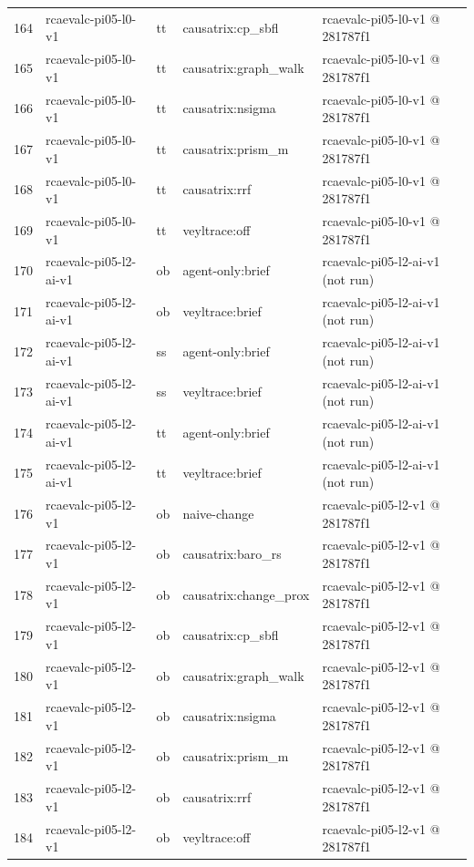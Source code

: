 \begin{longtable}{@{}r>{\raggedright\arraybackslash}p{87.0pt}>{\raggedright\arraybackslash}p{18.0pt}>{\raggedright\arraybackslash}p{63.0pt}>{\raggedright\arraybackslash}p{108.0pt}@{}}
164 & rcaevalc-pi05-l0-v1 & tt & causatrix:cp\_sbfl & rcaevalc-pi05-l0-v1 @ 281787f1 \\
165 & rcaevalc-pi05-l0-v1 & tt & causatrix:graph\_walk & rcaevalc-pi05-l0-v1 @ 281787f1 \\
166 & rcaevalc-pi05-l0-v1 & tt & causatrix:nsigma & rcaevalc-pi05-l0-v1 @ 281787f1 \\
167 & rcaevalc-pi05-l0-v1 & tt & causatrix:prism\_m & rcaevalc-pi05-l0-v1 @ 281787f1 \\
168 & rcaevalc-pi05-l0-v1 & tt & causatrix:rrf & rcaevalc-pi05-l0-v1 @ 281787f1 \\
169 & rcaevalc-pi05-l0-v1 & tt & veyltrace:off & rcaevalc-pi05-l0-v1 @ 281787f1 \\
170 & rcaevalc-pi05-l2-ai-v1 & ob & agent-only:brief & rcaevalc-pi05-l2-ai-v1 (not run) \\
171 & rcaevalc-pi05-l2-ai-v1 & ob & veyltrace:brief & rcaevalc-pi05-l2-ai-v1 (not run) \\
172 & rcaevalc-pi05-l2-ai-v1 & ss & agent-only:brief & rcaevalc-pi05-l2-ai-v1 (not run) \\
173 & rcaevalc-pi05-l2-ai-v1 & ss & veyltrace:brief & rcaevalc-pi05-l2-ai-v1 (not run) \\
174 & rcaevalc-pi05-l2-ai-v1 & tt & agent-only:brief & rcaevalc-pi05-l2-ai-v1 (not run) \\
175 & rcaevalc-pi05-l2-ai-v1 & tt & veyltrace:brief & rcaevalc-pi05-l2-ai-v1 (not run) \\
176 & rcaevalc-pi05-l2-v1 & ob & naive-change & rcaevalc-pi05-l2-v1 @ 281787f1 \\
177 & rcaevalc-pi05-l2-v1 & ob & causatrix:baro\_rs & rcaevalc-pi05-l2-v1 @ 281787f1 \\
178 & rcaevalc-pi05-l2-v1 & ob & causatrix:change\_prox & rcaevalc-pi05-l2-v1 @ 281787f1 \\
179 & rcaevalc-pi05-l2-v1 & ob & causatrix:cp\_sbfl & rcaevalc-pi05-l2-v1 @ 281787f1 \\
180 & rcaevalc-pi05-l2-v1 & ob & causatrix:graph\_walk & rcaevalc-pi05-l2-v1 @ 281787f1 \\
181 & rcaevalc-pi05-l2-v1 & ob & causatrix:nsigma & rcaevalc-pi05-l2-v1 @ 281787f1 \\
182 & rcaevalc-pi05-l2-v1 & ob & causatrix:prism\_m & rcaevalc-pi05-l2-v1 @ 281787f1 \\
183 & rcaevalc-pi05-l2-v1 & ob & causatrix:rrf & rcaevalc-pi05-l2-v1 @ 281787f1 \\
184 & rcaevalc-pi05-l2-v1 & ob & veyltrace:off & rcaevalc-pi05-l2-v1 @ 281787f1 \\

\end{longtable}
